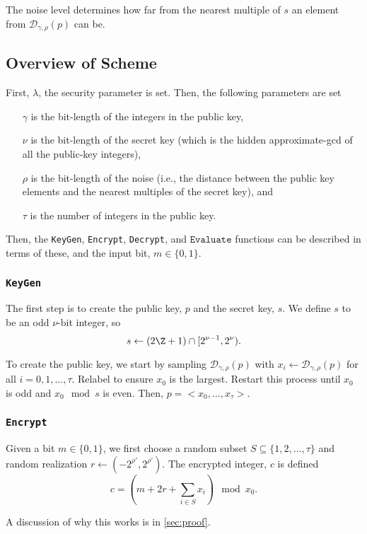 \documentclass[a4paper,11pt, oneside]{article}
\renewcommand{\D}{\mathcal{D}_{\gamma,\rho}(p)}
\begin{document}
The noise level determines how far from the nearest multiple of $s$ an element from $\D$ can be.

    \subsection{Overview of Scheme}
    First, $\lambda$, the security parameter is set.  Then, the following parameters are set
\begin{itemize}
    \item[$\gamma$] is the bit-length of the integers in the public key, 
    \item[$\nu$] is the bit-length of the secret key (which is the hidden approximate-gcd of all the public-key integers), 
    \item[$\rho$] is the bit-length of the noise (i.e., the distance between the public key elements and the nearest multiples of the secret key), and 
    \item[$\tau$] is the number of integers in the public key.
\end{itemize}

Then, the \texttt{KeyGen}, \texttt{Encrypt}, \texttt{Decrypt}, and $\texttt{Evaluate}$ functions can be described in terms of these, and the input bit, $m\in\{0,1\}$.

\subsubsection{\texttt{KeyGen}}
The first step is to create the public key, $p$ and the secret key, $s$.  We define $s$ to be an odd $\nu$-bit integer, so
\[ s\leftarrow (2\Z + 1)\cap [2^{\nu - 1}, 2^\nu).\]


To create the public key, we start by sampling $\D$ with $x_i \leftarrow \D$ for all $i=0,1,\dots,\tau$.  Relabel to ensure $x_0$ is the largest.  Restart this process until $x_0$ is odd and $x_0\mod{s}$ is even.  Then, $p = <x_0,\dots,x_\tau>$.
    
\subsubsection{\texttt{Encrypt}}

Given a bit $m\in\{0,1\}$, we first choose a random subset $S\subseteq \{1,2,\dots,\tau\}$ and random realization $r\leftarrow (-2^{\rho'},2^{\rho'})$.  The encrypted integer, $c$ is defined
\[c = \left( m+2r + \sum_{i\in S}x_i \right)\mod{x_0}.\]

A discussion of why this works is in \ref{sec:proof}.
\end{document}
